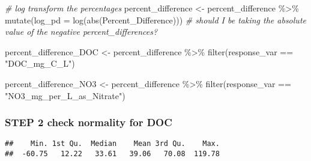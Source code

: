 \documentclass[
]{article}
\newenvironment{Shaded}{\begin{snugshade}}{\end{snugshade}}
\newcommand{\AttributeTok}[1]{\textcolor[rgb]{0.77,0.63,0.00}{#1}}
\newcommand{\CommentTok}[1]{\textcolor[rgb]{0.56,0.35,0.01}{\textit{#1}}}
\newcommand{\ConstantTok}[1]{\textcolor[rgb]{0.00,0.00,0.00}{#1}}
\newcommand{\FunctionTok}[1]{\textcolor[rgb]{0.00,0.00,0.00}{#1}}
\newcommand{\NormalTok}[1]{#1}
\newcommand{\OtherTok}[1]{\textcolor[rgb]{0.56,0.35,0.01}{#1}}
\newcommand{\SpecialCharTok}[1]{\textcolor[rgb]{0.00,0.00,0.00}{#1}}
\newcommand{\StringTok}[1]{\textcolor[rgb]{0.31,0.60,0.02}{#1}}
\begin{document}
\begin{Shaded}
\begin{Highlighting}[]
\CommentTok{\# log transform the percentages }
\NormalTok{percent\_difference }\OtherTok{\textless{}{-}}\NormalTok{ percent\_difference }\SpecialCharTok{\%\textgreater{}\%} 
  \FunctionTok{mutate}\NormalTok{(}\AttributeTok{log\_pd =} \FunctionTok{log}\NormalTok{(}\FunctionTok{abs}\NormalTok{(Percent\_Difference))) }\CommentTok{\# should I be taking the absolute value of the negative percent\_differences?}

\NormalTok{percent\_difference\_DOC }\OtherTok{\textless{}{-}}\NormalTok{ percent\_difference }\SpecialCharTok{\%\textgreater{}\%} 
  \FunctionTok{filter}\NormalTok{(response\_var }\SpecialCharTok{==} \StringTok{"DOC\_mg\_C\_L"}\NormalTok{)}

\NormalTok{percent\_difference\_NO3 }\OtherTok{\textless{}{-}}\NormalTok{ percent\_difference }\SpecialCharTok{\%\textgreater{}\%} 
  \FunctionTok{filter}\NormalTok{(response\_var }\SpecialCharTok{==} \StringTok{"NO3\_mg\_per\_L\_as\_Nitrate"}\NormalTok{)}
\end{Highlighting}
\end{Shaded}

\hypertarget{step-2-check-normality-for-doc}{%
\subsubsection{STEP 2 check normality for
DOC}\label{step-2-check-normality-for-doc}}

\begin{Shaded}
\end{Shaded}

\begin{verbatim}
##    Min. 1st Qu.  Median    Mean 3rd Qu.    Max. 
##  -60.75   12.22   33.61   39.06   70.08  119.78
\end{verbatim}

\begin{Shaded}
\end{Shaded}
\end{document}
